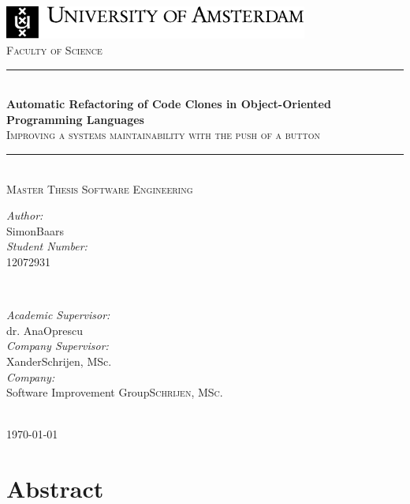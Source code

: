 \documentclass{report}
\title{\thesistitle}
\author{\thesisauthorfirst\space\thesisauthorsecond}
\date{\thesisdate}
\def\thesistitle{Automatic Refactoring of Code Clones in Object-Oriented Programming Languages}
\def\thesissubtitle{Improving a systems maintainability with the push of a button}
\def\thesisauthorfirst{Simon}
\def\thesisauthorsecond{Baars}
\def\thesissupervisorfirst{dr. Ana}
\def\thesissupervisorsecond{Oprescu}
\def\thesissecondreaderfirst{Xander}
\def\thesissecondreadersecond{Schrijen, MSc.}
\def\thesisdate{\today}
\theoremstyle{definition}
\theoremstyle{remark}
\begin{document}
\begin{titlepage}
	\thispagestyle{empty}
	\newcommand{\HRule}{\rule{\linewidth}{0.5mm}}
	\center
	\includegraphics[width=100mm]{img/logoUvA_en.pdf}\\[.5cm]
	\textsc{Faculty of Science}\\[0.5cm]

	\HRule \\[0.4cm]
	{ \huge \bfseries \thesistitle}\\[0.1cm]
	\textsc{\thesissubtitle}\\
	\HRule \\[.5cm]
	\textsc{\large Master Thesis Software Engineering}\\[2cm]

	\begin{minipage}{0.4\textwidth}
	\begin{flushleft} \large
	\emph{Author:}\\
	\thesisauthorfirst\space \thesisauthorsecond \\[1em]
	\emph{Student Number:}\\
	12072931 \\[1em]
	\end{flushleft}
	\end{minipage}
	~
	\begin{minipage}{0.4\textwidth}
	\begin{flushright} \large
	\emph{Academic Supervisor:} \\
	\thesissupervisorfirst\space \thesissupervisorsecond \\[1em]
	\emph{Company Supervisor:} \\
	\thesissecondreaderfirst\space \thesissecondreadersecond \\[1em]
	\emph{Company:} \\
	Software Improvement Group\space \textsc{\thesissecondreadersecond}
	\end{flushright}
	\end{minipage}\\[4cm]
	\vfill
	{\large \thesisdate}\\
	\clearpage
\end{titlepage}

\tableofcontents

\newpage
\chapter{Abstract}
\end{document}
